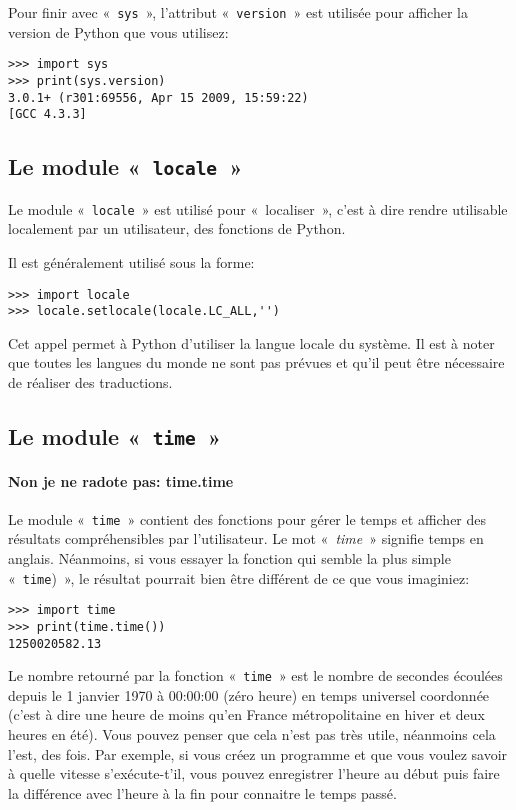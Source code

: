 Pour finir avec «~\texttt{sys}~», l'attribut «~\verb+version+~» est utilisée pour afficher la version de Python que vous utilisez:

\begin{Verbatim}[frame=single,rulecolor=\color{gray}]
>>> import sys
>>> print(sys.version)
3.0.1+ (r301:69556, Apr 15 2009, 15:59:22) 
[GCC 4.3.3]
\end{Verbatim}

\subsection*{Le module «~\texttt{locale}~»}
Le module «~\texttt{locale}~» est utilisé pour «~localiser~», c'est à dire rendre utilisable localement par un utilisateur, des fonctions de Python.

Il est généralement utilisé sous la forme:
\begin{Verbatim}[frame=single,rulecolor=\color{gray}]
>>> import locale
>>> locale.setlocale(locale.LC_ALL,'')
\end{Verbatim}

Cet appel permet à Python d'utiliser la langue locale du système. Il est à noter que toutes les langues du monde ne sont pas prévues et qu'il peut être nécessaire de réaliser des traductions.

\subsection*{Le module «~\texttt{time}~»}
\paragraph{Non je ne radote pas: time.time }

Le module «~\texttt{time}~» contient des fonctions pour gérer le temps et afficher des résultats compréhensibles par l'utilisateur. Le mot «~\emph{time}~» signifie temps en anglais. Néanmoins, si vous essayer la fonction qui semble la plus simple «~\verb+time+)~», le résultat pourrait bien être différent de ce que vous imaginiez:

\begin{Verbatim}[frame=single,rulecolor=\color{gray}]
>>> import time
>>> print(time.time())
1250020582.13
\end{Verbatim}

Le nombre retourné par la fonction «~\texttt{time}~»  est le nombre de secondes écoulées depuis le 1 janvier 1970 à 00:00:00 (zéro heure) en temps universel coordonnée (c'est à dire une heure de moins qu'en France métropolitaine en hiver et deux heures en été). Vous pouvez penser que cela n'est pas très utile, néanmoins cela l'est, des fois. Par exemple, si vous créez un programme et que vous voulez savoir à quelle vitesse s'exécute-t'il, vous pouvez enregistrer l'heure au début puis faire la différence avec l'heure à la fin pour connaitre le temps passé.

